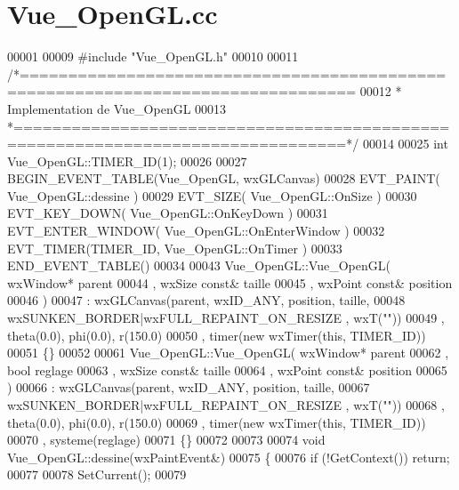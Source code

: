 \section{Vue\+\_\+\+Open\+G\+L.\+cc}
\label{_vue___open_g_l_8cc_source}

\begin{DoxyCode}
00001 
00009 \textcolor{preprocessor}{#include "Vue_OpenGL.h"}
00010 
00011 \textcolor{comment}{/*================================================================================}
00012 \textcolor{comment}{ * Implementation de Vue\_OpenGL}
00013 \textcolor{comment}{ *================================================================================*/}
00014 
00025 \textcolor{keywordtype}{int} Vue\_OpenGL::TIMER\_ID(1);
00026 
00027 BEGIN\_EVENT\_TABLE(Vue_OpenGL, wxGLCanvas)
00028     EVT\_PAINT(          Vue_OpenGL::dessine       )
00029     EVT\_SIZE(           Vue_OpenGL::OnSize        )
00030     EVT\_KEY\_DOWN(       Vue_OpenGL::OnKeyDown     )
00031     EVT\_ENTER\_WINDOW(   Vue_OpenGL::OnEnterWindow )
00032     EVT\_TIMER(TIMER\_ID, Vue_OpenGL::OnTimer       )
00033 END\_EVENT\_TABLE()
00034 
00043 Vue_OpenGL::Vue_OpenGL( wxWindow*      parent
00044                       , wxSize  const& taille
00045                       , wxPoint const& position
00046                       )
00047 : wxGLCanvas(parent, wxID\_ANY, position, taille, 
00048              wxSUNKEN\_BORDER|wxFULL\_REPAINT\_ON\_RESIZE , wxT(""))
00049 , theta(0.0), phi(0.0), r(150.0) 
00050 , timer(new wxTimer(this, TIMER\_ID))
00051 \{\}
00052 
00061 Vue_OpenGL::Vue_OpenGL( wxWindow*      parent
00062                       , \textcolor{keywordtype}{bool} reglage
00063                       , wxSize  \textcolor{keyword}{const}& taille
00064                       , wxPoint \textcolor{keyword}{const}& position
00065                       )
00066 : wxGLCanvas(parent, wxID\_ANY, position, taille, 
00067              wxSUNKEN\_BORDER|wxFULL\_REPAINT\_ON\_RESIZE , wxT(\textcolor{stringliteral}{""}))
00068 , theta(0.0), phi(0.0), r(150.0) 
00069 , timer(new wxTimer(this, TIMER\_ID))
00070 , systeme(reglage)
00071 \{\}
00072 
00073 
00074 \textcolor{keywordtype}{void} Vue_OpenGL::dessine(wxPaintEvent&)
00075 \{
00076   \textcolor{keywordflow}{if} (!GetContext()) \textcolor{keywordflow}{return};
00077 
00078   SetCurrent();
00079 

\end{DoxyCode}
